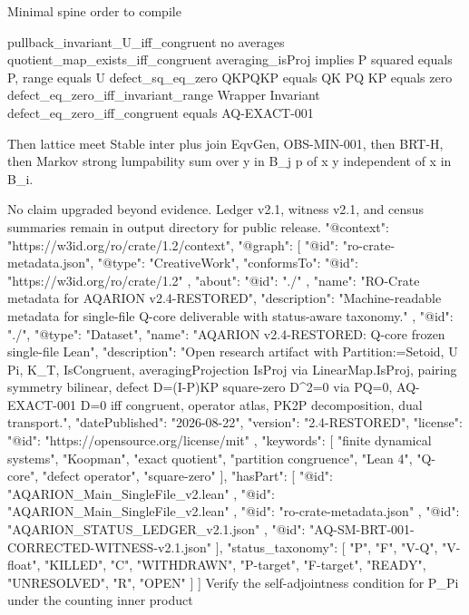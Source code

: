 Minimal spine order to compile

pullback_invariant_U_iff_congruent no averages
quotient_map_exists_iff_congruent
averaging_isProj implies P squared equals P, range equals U
defect_sq_eq_zero QKPQKP equals QK PQ KP equals zero
defect_eq_zero_iff_invariant_range Wrapper Invariant
defect_eq_zero_iff_congruent equals AQ-EXACT-001

Then lattice meet Stable inter plus join EqvGen, OBS-MIN-001, then BRT-H, then Markov strong lumpability sum over y in B_j p of x y independent of x in B_i.

No claim upgraded beyond evidence. Ledger v2.1, witness v2.1, and census summaries remain in output directory for public release.{
  "@context": "https://w3id.org/ro/crate/1.2/context",
  "@graph": [
    {
      "@id": "ro-crate-metadata.json",
      "@type": "CreativeWork",
      "conformsTo": {
        "@id": "https://w3id.org/ro/crate/1.2"
      },
      "about": {
        "@id": "./"
      },
      "name": "RO-Crate metadata for AQARION v2.4-RESTORED",
      "description": "Machine-readable metadata for single-file Q-core deliverable with status-aware taxonomy."
    },
    {
      "@id": "./",
      "@type": "Dataset",
      "name": "AQARION v2.4-RESTORED: Q-core frozen single-file Lean",
      "description": "Open research artifact with Partition:=Setoid, U Pi, K_T, IsCongruent, averagingProjection IsProj via LinearMap.IsProj, pairing symmetry bilinear, defect D=(I-P)KP square-zero D^2=0 via PQ=0, AQ-EXACT-001 D=0 iff congruent, operator atlas, PK2P decomposition, dual transport.",
      "datePublished": "2026-08-22",
      "version": "2.4-RESTORED",
      "license": {
        "@id": "https://opensource.org/license/mit"
      },
      "keywords": [
        "finite dynamical systems",
        "Koopman",
        "exact quotient",
        "partition congruence",
        "Lean 4",
        "Q-core",
        "defect operator",
        "square-zero"
      ],
      "hasPart": [
        {
          "@id": "AQARION_Main_SingleFile_v2.lean"
        },
        {
          "@id": "AQARION_Main_SingleFile_v2.lean"
        },
        {
          "@id": "ro-crate-metadata.json"
        },
        {
          "@id": "AQARION_STATUS_LEDGER_v2.1.json"
        },
        {
          "@id": "AQ-SM-BRT-001-CORRECTED-WITNESS-v2.1.json"
        }
      ],
      "status_taxonomy": [
        "P",
        "F",
        "V-Q",
        "V-float",
        "KILLED",
        "C",
        "WITHDRAWN",
        "P-target",
        "F-target",
        "READY",
        "UNRESOLVED",
        "R",
        "OPEN"
      ]
    }
  ]
}
Verify the self-adjointness condition for P_Pi under the counting inner product

